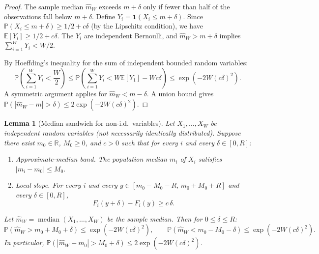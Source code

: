 \documentclass[11pt]{article}
\newtheorem{lemma}[theorem]{Lemma}
\theoremstyle{definition}
\newcommand{\E}{\mathbb{E}}
\newcommand{\R}{\mathbb{R}}
\newcommand{\Prob}{\mathbb{P}}
\newcommand{\abs}[1]{\left| #1 \right|}
\begin{document}
\begin{proof}
The sample median $\hat{m}_W$ exceeds $m + \delta$ only if fewer than half
of the observations fall below $m + \delta$. Define $Y_i = \mathbf{1}(X_i \leq m + \delta)$.
Since $\Prob(X_i \leq m + \delta) \geq 1/2 + c\delta$ (by the Lipschitz condition),
we have $\E[Y_i] \geq 1/2 + c\delta$. The $Y_i$ are independent Bernoulli, and
$\hat{m}_W > m + \delta$ implies $\sum_{i=1}^W Y_i < W/2$.

By Hoeffding's inequality for the sum of independent bounded random variables:
\[
  \Prob\!\left(\sum_{i=1}^W Y_i < \frac{W}{2}\right)
  \leq \Prob\!\left(\sum_{i=1}^W Y_i < W\E[Y_1] - Wc\delta\right)
  \leq \exp\!\left(-2W(c\delta)^2\right).
\]
A symmetric argument applies for $\hat{m}_W < m - \delta$. A union bound
gives $\Prob(\abs{\hat{m}_W - m} > \delta) \leq 2\exp(-2W(c\delta)^2)$.
\end{proof}

\begin{lemma}[Median sandwich for non-i.d.\ variables]\label{lem:median_sandwich}
Let $X_1, \ldots, X_W$ be independent random variables (not necessarily
identically distributed). Suppose there exist $m_0 \in \R$, $M_0 \geq 0$,
and $c > 0$ such that for every $i$ and every $\delta \in [0, R]$:
\begin{enumerate}[label=(\roman*),noitemsep]
  \item \emph{Approximate-median band.} The population median $m_i$ of $X_i$
    satisfies $\abs{m_i - m_0} \leq M_0$.
  \item \emph{Local slope.} For every $i$ and every
    $y \in [m_0 - M_0 - R, \, m_0 + M_0 + R]$ and every $\delta \in [0, R]$,
    \[
      F_i(y + \delta) - F_i(y) \geq c\,\delta.
    \]
\end{enumerate}
Let $\hat{m}_W = \operatorname{median}(X_1, \ldots, X_W)$ be the sample median.
Then for $0 \leq \delta \leq R$:
\begin{equation}\label{eq:median_sandwich}
  \Prob\!\left(\hat{m}_W > m_0 + M_0 + \delta\right) \leq \exp(-2W(c\delta)^2),
  \qquad
  \Prob\!\left(\hat{m}_W < m_0 - M_0 - \delta\right) \leq \exp(-2W(c\delta)^2).
\end{equation}
In particular, $\Prob(\abs{\hat{m}_W - m_0} > M_0 + \delta) \leq 2\exp(-2W(c\delta)^2)$.
\end{lemma}
\end{document}

